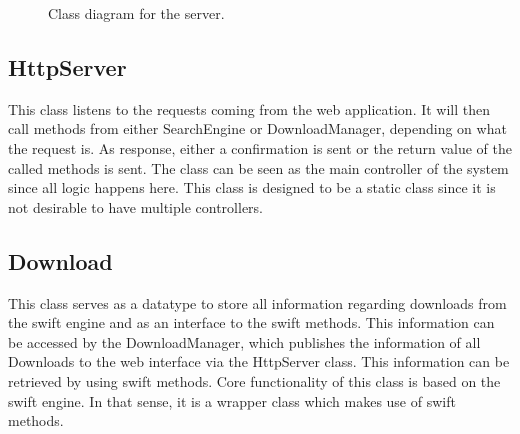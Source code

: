\begin{center}
\begin{figure}[h!]
\label{fig:class_server}
\caption{Class diagram for the server.}
\end{figure}
\end{center}
\clearpage

\subsection{HttpServer}
This class listens to the requests coming from the web application.
It will then call methods from either SearchEngine or DownloadManager, depending on what the request is. As response, either a confirmation
is sent or the return value of the called methods is sent. The class can be seen as the main controller of the system
since all logic happens here. This class is designed to be a static class since it is not desirable to have multiple controllers.

\subsection{Download}
This class serves as a datatype to store all information regarding downloads from the swift engine and as an interface to the swift methods.
This information can be accessed by the DownloadManager, which publishes the information of all Downloads to the web interface via
the HttpServer class. This information can be retrieved by using swift methods. Core functionality of this class is based on the swift engine.
In that sense, it is a wrapper class which makes use of swift methods.

